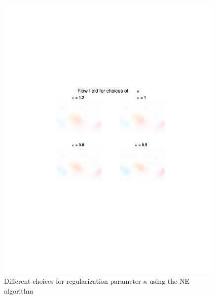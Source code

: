 \documentclass[10pt,a4paper]{article}
\begin{document}
\begin{figure}
    \centering
    \includegraphics[scale=0.8]{regularizationNE}
    \caption{Different choices for regularization parameter $\kappa$ using the NE algorithm}
    \label{reguNE}
\end{figure}
\end{document}
